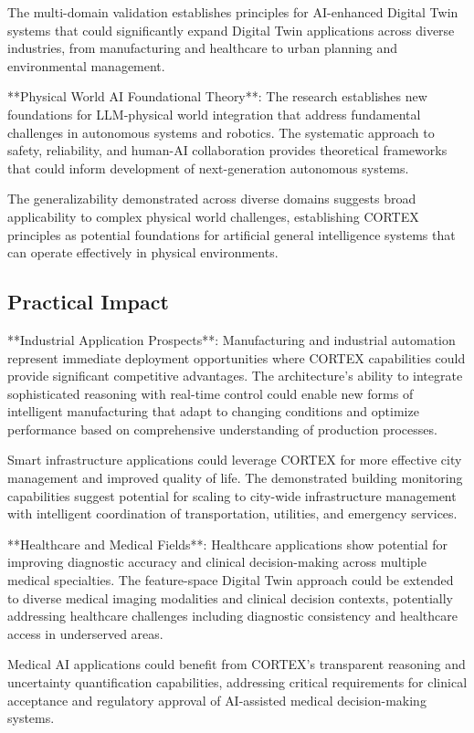 The multi-domain validation establishes principles for AI-enhanced Digital Twin systems that could significantly expand Digital Twin applications across diverse industries, from manufacturing and healthcare to urban planning and environmental management.

**Physical World AI Foundational Theory**:
The research establishes new foundations for LLM-physical world integration that address fundamental challenges in autonomous systems and robotics. The systematic approach to safety, reliability, and human-AI collaboration provides theoretical frameworks that could inform development of next-generation autonomous systems.

The generalizability demonstrated across diverse domains suggests broad applicability to complex physical world challenges, establishing CORTEX principles as potential foundations for artificial general intelligence systems that can operate effectively in physical environments.

\subsection{Practical Impact}

**Industrial Application Prospects**:
Manufacturing and industrial automation represent immediate deployment opportunities where CORTEX capabilities could provide significant competitive advantages. The architecture's ability to integrate sophisticated reasoning with real-time control could enable new forms of intelligent manufacturing that adapt to changing conditions and optimize performance based on comprehensive understanding of production processes.

Smart infrastructure applications could leverage CORTEX for more effective city management and improved quality of life. The demonstrated building monitoring capabilities suggest potential for scaling to city-wide infrastructure management with intelligent coordination of transportation, utilities, and emergency services.

**Healthcare and Medical Fields**:
Healthcare applications show potential for improving diagnostic accuracy and clinical decision-making across multiple medical specialties. The feature-space Digital Twin approach could be extended to diverse medical imaging modalities and clinical decision contexts, potentially addressing healthcare challenges including diagnostic consistency and healthcare access in underserved areas.

Medical AI applications could benefit from CORTEX's transparent reasoning and uncertainty quantification capabilities, addressing critical requirements for clinical acceptance and regulatory approval of AI-assisted medical decision-making systems.

